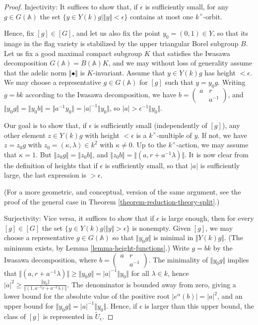 \begin{proof}
 Injectivity: It suffices to show that, if $\epsilon$ is sufficiently small, for any $g\in G(\mathbb A)$ the set $\{y \in Y(k)g| \Vert y\Vert <\epsilon\}$ contains at most one $k^\times$-orbit.
 
 Hence, fix $[g]\in [G]$, and let us also fix the point $y_0 =(0,1)\in Y$, so that its image in the flag variety is stabilized by the upper triangular Borel subgroup $B$. Let us fix a good maximal compact subgroup $K$ that satisfies the Iwasawa decomposition $G(\mathbb A) = B(\mathbb A)K$, and we may without loss of generality assume that the adelic norm $\Vert \bullet \Vert $ is $K$-invariant. Assume that $y\in Y(k)g$ has height $<\epsilon$. We may choose a representative $g\in G(\mathbb A)$ for $[g]$ such that $y = y_0 g$.  
 Writing $g = bk$ according to the Iwasawa decomposition, we have $ b = \begin{pmatrix} a & r \\ & a^{-1}\end{pmatrix}$, and $ \Vert y_0 g\Vert = \Vert y_0 b\Vert = \Vert a^{-1} y_0\Vert = |a|^{-1} \Vert y_0\Vert$, so $|a| > \epsilon^{-1} \Vert y_0\Vert$. 
 
 Our goal is to show that, if $\epsilon$ is sufficiently small (independently of $[g]$), any other element $z\in Y(k)g$ with height $<\epsilon$ is a $k^\times$-multiple of $y$. If not, we have $z = z_0 g$ with $z_0 = (\kappa, \lambda) \in k^2$ with $\kappa\ne 0$. Up to the $k^\times$-action, we may assume that $\kappa=1$. But $\Vert z_0 g\Vert = \Vert z_0 b\Vert$, and $\Vert z_0 b\Vert = \Vert (a , r + a^{-1} \lambda)\Vert$. It is now clear from the definition of heights that if $\epsilon$ is sufficiently small, so that $|a|$ is sufficiently large, the last expression is $>\epsilon$.
 
 (For a more geometric, and conceptual, version of the same argument, see the proof of the general case in Theorem \ref{theorem-reduction-theory-split}.)
 
 Surjectivity: Vice versa, it suffices to show that if $\epsilon$ is large enough, then for every $[g]\in [G]$ the set $\{y\in Y(k)g | \Vert y\Vert >\epsilon\}$ is nonempty. Given $[g]$, we may choose a representative $g\in G(\mathbb A)$ so that $\Vert y_0 g\Vert$ is minimal in $\Vert Y(k)g\Vert$. (The minimum exists, by Lemma \ref{lemma-height-functions}.) Write $g = bk$ by the Iwasawa decomposition, where $b = \begin{pmatrix} a & r \\ & a^{-1}\end{pmatrix}$. The minimality of $\Vert y_0 g\Vert$ implies that 
 $\Vert (a , r + a^{-1} \lambda)\Vert \ge \Vert y_0 g\Vert = |a|^{-1} \Vert y_0 \Vert$ for all $\lambda\in k$, hence $|a|^2 \ge \frac{\Vert y_0\Vert }{\Vert (1 , a^{-1} r + a^{-2} \lambda)\Vert}$. The denominator is bounded away from zero, giving a lower bound for the absolute value of the positive root $|e^\alpha(b)| = |a|^2$, and an upper bound for $\Vert y_0 g\Vert = |a|^{-1} \Vert y_0 \Vert$. Hence, if $\epsilon$ is larger than this upper bound, the class of $[g]$ is represented in $\tilde U_\epsilon$.
 
 
\end{proof}
